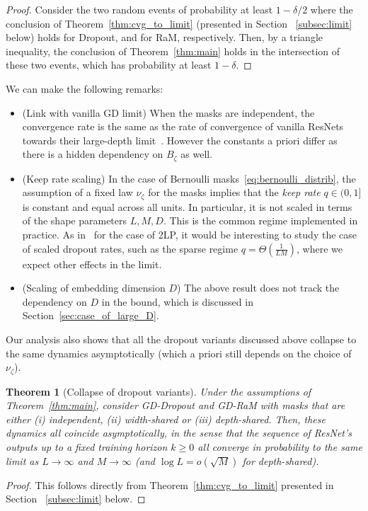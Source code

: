 \documentclass[a4paper,11pt]{article}
\newcommand{\1}{\mathbbm{1}}
\newtheorem{theorem}{Theorem}[section]
\theoremstyle{definition}
\theoremstyle{remark}
\begin{document}
\begin{proof}
Consider the two random events of probability at least $1-\delta/2$ where the conclusion of Theorem~\ref{thm:cvg_to_limit} (presented in Section~
    \ref{subsec:limit} below) holds for Dropout, and for RaM, respectively. Then, by a triangle inequality, the conclusion of Theorem~\ref{thm:main} holds in the intersection of these two events, which has probability at least $1-\delta$.
\end{proof}
We can make the following remarks:
\begin{itemize}
    \item (Link with vanilla GD limit) When the masks are independent, the convergence rate is the same as the rate of convergence of vanilla ResNets towards their large-depth limit~\cite{chizat2025hidden}. However the constants a priori differ as there is a hidden dependency on $B_\zeta$ as well.
    \item (Keep rate scaling) In the case of Bernoulli masks~\eqref{eq:bernoulli_distrib}, the assumption of a fixed law $\nu_\zeta$ for the masks implies that the \textit{keep rate} $q\in(0,1]$ is constant and equal across all units. In particular, it is not scaled in terms of the shape parameters $L,M,D$. This is the common regime implemented in practice. As in~\cite{chizat2025phasediagramdropouttwolayer} for the case of 2LP, it would be interesting to study the case of scaled dropout rates, such as the sparse regime $q = \Theta(\frac{1}{LM})$, where we expect other effects in the limit.
    \item (Scaling of embedding dimension $D$) The above result does not track the dependency on $D$ in the bound, which is discussed in Section~\ref{sec:case_of_large_D}.
\end{itemize}

Our analysis also shows that all the dropout variants discussed above collapse to the same dynamics asymptotically (which a priori still depends on the choice of $\nu_\zeta$).

\begin{theorem}[Collapse of dropout variants]\label{thm:collapse_dropout_variants}
Under the assumptions of Theorem~\ref{thm:main}, consider GD-Dropout and GD-RaM with masks that are either (i) independent, (ii) width-shared or (iii) depth-shared. 
     Then, these dynamics all \emph{coincide asymptotically}, in the sense that the sequence of ResNet's outputs up to a fixed training horizon $k\geq 0$ all converge in probability to the same limit as $L\to \infty$ and $M\to \infty$ (and $\log L=o(\sqrt{M})$ for depth-shared).
\end{theorem}
\begin{proof}
    This follows directly from Theorem~\ref{thm:cvg_to_limit} presented in Section~
    \ref{subsec:limit} below.
\end{proof}
\end{document}
